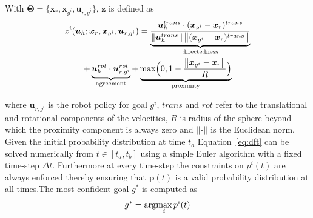 With $\boldsymbol{\Theta} = \{\boldsymbol{x}_r, \boldsymbol{x}_{g^i}, \boldsymbol{u}_{r, g^i}\}$, $\boldsymbol{z}$ is defined as 
\begin{multline}
z^i(\boldsymbol{u}_h;\boldsymbol{x}_r, \boldsymbol{x}_{g^i}, \boldsymbol{u}_{r, g^i}) = \underbrace{\frac{\boldsymbol{u}_h^{trans}\cdot(\boldsymbol{x}_{g^i} - \boldsymbol{x}_r)^{trans}}{\left\lVert\boldsymbol{u}_h^{trans}\right\rVert\left\lVert(\boldsymbol{x}_{g^i} - \boldsymbol{x}_r)^{trans}\right\rVert}}_{\text{directedness}}\\ + \underbrace{\boldsymbol{u}_{h}^{rot}\cdot\boldsymbol{u}_{r,g^i}^{rot}}_{\text{agreement}}
+ \underbrace{\text{max}\Big(0, 1-\frac{\left\lVert\boldsymbol{x}_{g^i} - \boldsymbol{x}_r\right\rVert}{R}\Big)}_{\text{proximity}}
\end{multline}

where  $\boldsymbol{u}_{r,g^i}$ is the robot policy for goal $g^i$, $trans$ and $rot$ refer to the translational and rotational components of the velocities,  $R$ is radius of the sphere beyond which the proximity component is always zero and $\left\lVert\cdot\right\rVert$ is the Euclidean norm. 
Given the initial probability distribution at time $t_a$ Equation~\ref{eq:dft} can be solved numerically from $t \in [t_a, t_b]$ using a simple Euler algorithm with a fixed time-step $\Delta t$. Furthermore at every time-step the constraints on $p^i(t)$ are always enforced thereby ensuring that $\boldsymbol{p}(t)$ is a valid probability distribution at all times.The most confident goal $g^*$ is computed as 
\begin{equation}
g^* = \arg\!\max_i  p^i(t)
\end{equation}
	
